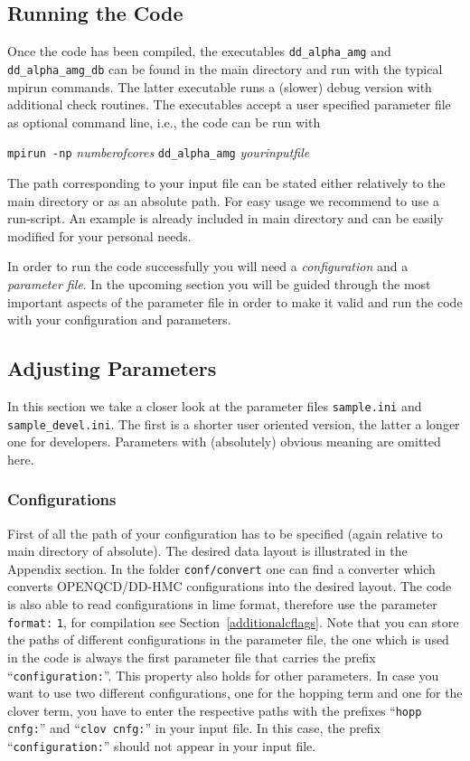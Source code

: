 \documentclass[a4paper,12pt]{scrartcl}
\begin{document}
\subsection{Running the Code}\label{run_wilson:ss}
Once the code has been compiled, the executables \texttt{dd\_alpha\_amg} and \texttt{dd\_alpha\_amg\_db} can be found in the main directory and run with the typical mpirun commands. The latter executable runs a (slower) debug version with additional check routines. The executables accept a user specified parameter file as optional command line, i.e., the code can be run with
\begin{center}
\texttt{mpirun -np} \textit{numberofcores} \texttt{dd\_alpha\_amg} \textit{yourinputfile}
\end{center}
The path corresponding to your input file can be stated either relatively to the main directory or as an absolute path. For easy usage we recommend to use a run-script. An example is already included in main directory and can be easily modified for your personal needs.

In order to run the code successfully you will need a \textit{configuration} and a \textit{parameter file}. In the upcoming section you will be guided through the most important aspects of the parameter file in order to make it valid and run the code with your configuration and parameters.

\subsection{Adjusting Parameters}\label{param_wilson:ss}
In this section we take a closer look at the parameter files \texttt{sample.ini} and \texttt{sample\_devel.ini}. The first is a shorter user oriented version, the latter a longer one for developers. Parameters with (absolutely) obvious meaning are omitted here.

\subsubsection{Configurations}
First of all the path of your configuration has to be specified (again relative to main directory of absolute). The desired data layout is illustrated in the Appendix section. In the folder \texttt{conf/convert} one can find a converter which converts OPENQCD/DD-HMC configurations into the desired layout. The code is also able to read configurations in lime format, therefore use the parameter \texttt{format:} \texttt{1}, for compilation see Section~\ref{additionalcflags}. Note that you can store the paths of different configurations in the parameter file, the one which is used in the code is always the first parameter file that carries the prefix ``\texttt{configuration:}''. This property also holds for other parameters. In case you want to use two different configurations, one for the hopping term and one for the clover term, you have to enter the respective paths with the prefixes  ``\texttt{hopp cnfg:}'' and ``\texttt{clov cnfg:}'' in your input file. In this case, the prefix ``\texttt{configuration:}'' should not appear in your input file.
\end{document}
